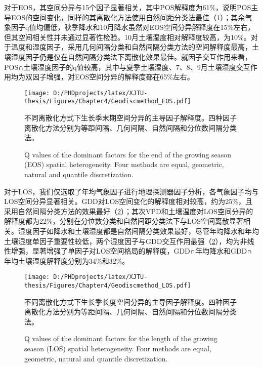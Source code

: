 对于EOS，其空间分异与15个因子显著相关，其中POS解释度为61\%，说明POS主导EOS的空间变化，同样的其离散化方法使用自然间距分类法最佳（\cref{C4:5}）；其余气象因子q值均偏低，秋季降水和10月降水虽然对EOS空间分异解释度在15\%左右，但其空间相关性并未通过显著性检验。10月土壤湿度相对解释度较高，为10\%。对于温度和湿度因子，采用几何间隔分类和自然间隔分类方法的空间解释度最高，土壤湿度因子仍是仅在自然间隔分类法下离散化效果最佳。就因子交互作用来看，POS∩土壤湿度因子的q值较高，其中与夏季土壤湿度、7、8、9月土壤湿度交互作用均为双因子增强，对EOS空间分异的解释度都在65\%左右。

\renewcommand{\dblfloatpagefraction}{.8}
\begin{figure}[ht]
  \centering
  \setlength\abovedisplayskip{0pt}
  \texttt{[image: D:/PHDprojects/latex/XJTU-thesis/Figures/Chapter4/Geodiscmethod\_EOS.pdf]}
  \caption{不同离散化方式下生长季末期空间分异的主导因子解释度。四种因子离散化方法分别为等距间隔、几何间隔、自然间隔和分位数间隔分类法。}
  \addtocounter{figure}{-1}
  \vspace{5pt}
  \renewcommand{\figurename}{Fig}
  \caption{Q values of the dominant factors for the end of the growing season (EOS) spatial heterogeneity. Four methods are equal, geometric, natural and quantile discretization. }
  \label{C4:5}
\end{figure}

对于LOS，我们仅选取了年均气象因子进行地理探测器因子分析，各气象因子均与LOS空间分异显著相关。GDD对LOS空间变化的解释度相对较高，约为25\%，且采用自然间隔分类方法的效果最好（\cref{C4:6}）；其次VPD和土壤温度对LOS空间分异的解释度都为22\%，分别在分位数分类和自然间距分类法下与LOS空间离散显著相关。湿度因子如降水和土壤湿度都是自然间隔分类效果最好，尽管年均降水和年均土壤湿度单因子重要性较低，两个湿度因子与GDD交互作用最强（\cref{C4:6}），均为非线性增强，显著增强了单因子对LOS空间格局的解释度，GDD∩年均降水和GDD∩年均土壤湿度解释度分别为34\%和32\%。

\renewcommand{\dblfloatpagefraction}{.8}
\begin{figure}[ht]
  \centering
  \setlength\abovedisplayskip{0pt}
  \texttt{[image: D:/PHDprojects/latex/XJTU-thesis/Figures/Chapter4/Geodiscmethod\_LOS.pdf]}
  \caption{不同离散化方式下生长季长度空间分异的主导因子解释度。四种因子离散化方法分别为等距间隔、几何间隔、自然间隔和分位数间隔分类法。}
  \addtocounter{figure}{-1}
  \vspace{5pt}
  \renewcommand{\figurename}{Fig}
  \caption{Q values of the dominant factors for the length of the growing season (LOS) spatial heterogeneity. Four methods are equal, geometric, natural and quantile discretization. }
  \label{C4:6}
\end{figure}


